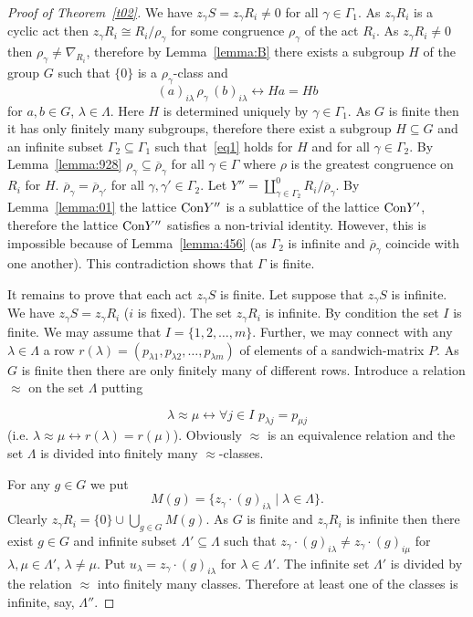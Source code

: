 \documentclass{birkau}
\numberwithin{equation}{section}
\theoremstyle{plain}
\theoremstyle{definition}
\begin{document}
\begin{proof}[Proof of Theorem~\ref{t02}]
        We have $z_\gamma S = z_\gamma R_i \ne 0$ for all $\gamma \in \Gamma_1$. As $z_\gamma R_i$ is a cyclic act then $z_\gamma R_i \cong R_i/\rho_\gamma$ for some congruence $\rho_\gamma$ of the act $R_i$. As $z_\gamma R_i \ne 0$ then $\rho_\gamma \ne \nabla_{R_i}$, therefore by Lemma~\ref{lemma:B} there exists a subgroup $H$ of the group $G$ such that $\{ 0 \}$ is a $\rho_\gamma$-class and
        $$ (a)_{i\lambda}\, \rho_\gamma \, (b)_{i\lambda} \leftrightarrow Ha=Hb  $$
        for $a,b\in G$, $\lambda \in \Lambda$. Here $H$ is determined uniquely by $\gamma \in \Gamma_1$. As $G$ is finite then it has only finitely many subgroups, therefore there exist a subgroup $H \subseteq G$ and an infinite subset $\Gamma_2 \subseteq \Gamma_1$ such that~\eqref{eq1} holds for $H$ and for all $\gamma \in \Gamma_2$. By Lemma~\ref{lemma:928} $\rho_\gamma \subseteq \overline \rho_\gamma$ for all $\gamma \in \Gamma$ where $\rho$ is the greatest congruence on $R_i$ for $H$. $\overline \rho_\gamma = \overline\rho_{\gamma'}$ for all $\gamma, \gamma' \in \Gamma_2$. Let $Y''= \coprod_{\gamma \in \Gamma_2}^0 R_i/{\overline \rho_\gamma}$. By Lemma~\ref{lemma:01} the lattice ${\rm Con}Y''$ is a sublattice of the lattice ${\rm Con}Y'$, therefore the lattice ${\rm Con}Y''$ satisfies a non-trivial identity. However, this is impossible because of Lemma~\ref{lemma:456} (as $\Gamma_2$ is infinite and $\overline\rho_\gamma$ coincide with one another). This contradiction shows that $\Gamma$ is finite.

        It remains to prove that each act $z_\gamma S$ is finite. Let suppose that $z_\gamma S$ is infinite. We have $z_\gamma S = z_\gamma R_i$ ($i$ is fixed). The set $z_\gamma R_i$ is infinite. By condition the set $I$ is finite. We may assume that $I=\{ 1,2, \ldots, m\}$. Further, we may connect with any $\lambda \in \Lambda$ a row $r(\lambda) = (p_{\lambda 1}, p_{\lambda 2}, \ldots, p_{\lambda m})$ of elements of a sandwich-matrix $P$. As $G$ is finite then there are only finitely many of different rows. Introduce a relation $\approx$ on the set $\Lambda$ putting

        $$ \lambda \approx \mu \leftrightarrow \forall j\in I \,\, p_{\lambda j} = p_{\mu j} $$
        (i.e. $\lambda \approx \mu \leftrightarrow r(\lambda) = r(\mu)$). Obviously $\approx$ is an equivalence relation and the set $\Lambda$ is divided into finitely many ${\approx}$-classes.

        For any $g \in G$ we put $$ M(g)= \{ z_\gamma \cdot (g)_{i\lambda} \mid \lambda \in \Lambda \}.  $$ Clearly $z_\gamma R_i = \{0\} \cup \bigcup_{g\in G} M(g)$. As $G$ is finite and $z_\gamma R_i$ is infinite then there exist $g\in G$ and infinite subset $\Lambda' \subseteq \Lambda$ such that $z_\gamma \cdot (g)_{ i \lambda } \ne z_\gamma \cdot (g)_{ i \mu}$ for $\lambda, \mu \in \Lambda'$, $\lambda \ne \mu$. Put $u_\lambda=z_\gamma \cdot (g)_{i\lambda}$ for $\lambda \in \Lambda'$. The infinite set $\Lambda'$ is divided by the relation $\approx$ into finitely many classes. Therefore at least one of the classes is infinite, say, $\Lambda''$.


\end{proof}
\end{document}

